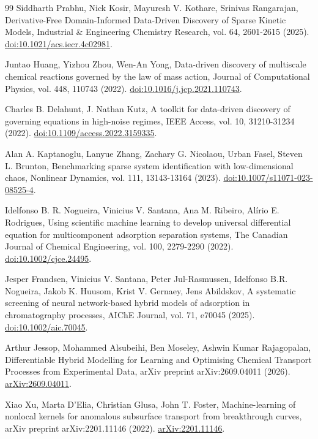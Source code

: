 \begin{thebibliography}{99}
 Siddharth Prabhu, Nick Kosir, Mayuresh V. Kothare, Srinivas Rangarajan, Derivative-Free Domain-Informed Data-Driven Discovery of Sparse Kinetic Models, Industrial \& Engineering Chemistry Research, vol. 64, 2601-2615 (2025). \href{https://doi.org/10.1021/acs.iecr.4c02981}{doi:10.1021/acs.iecr.4c02981}.

 Juntao Huang, Yizhou Zhou, Wen-An Yong, Data-driven discovery of multiscale chemical reactions governed by the law of mass action, Journal of Computational Physics, vol. 448, 110743 (2022). \href{https://doi.org/10.1016/j.jcp.2021.110743}{doi:10.1016/j.jcp.2021.110743}.

 Charles B. Delahunt, J. Nathan Kutz, A toolkit for data-driven discovery of governing equations in high-noise regimes, IEEE Access, vol. 10, 31210-31234 (2022). \href{https://doi.org/10.1109/access.2022.3159335}{doi:10.1109/access.2022.3159335}.

 Alan A. Kaptanoglu, Lanyue Zhang, Zachary G. Nicolaou, Urban Fasel, Steven L. Brunton, Benchmarking sparse system identification with low-dimensional chaos, Nonlinear Dynamics, vol. 111, 13143-13164 (2023). \href{https://doi.org/10.1007/s11071-023-08525-4}{doi:10.1007/s11071-023-08525-4}.

 Idelfonso B. R. Nogueira, Vinicius V. Santana, Ana M. Ribeiro, Alírio E. Rodrigues, Using scientific machine learning to develop universal differential equation for multicomponent adsorption separation systems, The Canadian Journal of Chemical Engineering, vol. 100, 2279-2290 (2022). \href{https://doi.org/10.1002/cjce.24495}{doi:10.1002/cjce.24495}.

 Jesper Frandsen, Vinicius V. Santana, Peter Jul-Rasmussen, Idelfonso B.R. Nogueira, Jakob K. Huusom, Krist V. Gernaey, Jens Abildskov, A systematic screening of neural network-based hybrid models of adsorption in chromatography processes, AIChE Journal, vol. 71, e70045 (2025). \href{https://doi.org/10.1002/aic.70045}{doi:10.1002/aic.70045}.

 Arthur Jessop, Mohammed Alsubeihi, Ben Moseley, Ashwin Kumar Rajagopalan, Differentiable Hybrid Modelling for Learning and Optimising Chemical Transport Processes from Experimental Data, arXiv preprint arXiv:2609.04011 (2026). \href{https://arxiv.org/abs/2609.04011}{arXiv:2609.04011}.

 Xiao Xu, Marta D'Elia, Christian Glusa, John T. Foster, Machine-learning of nonlocal kernels for anomalous subsurface transport from breakthrough curves, arXiv preprint arXiv:2201.11146 (2022). \href{https://arxiv.org/abs/2201.11146}{arXiv:2201.11146}.


\end{thebibliography}
